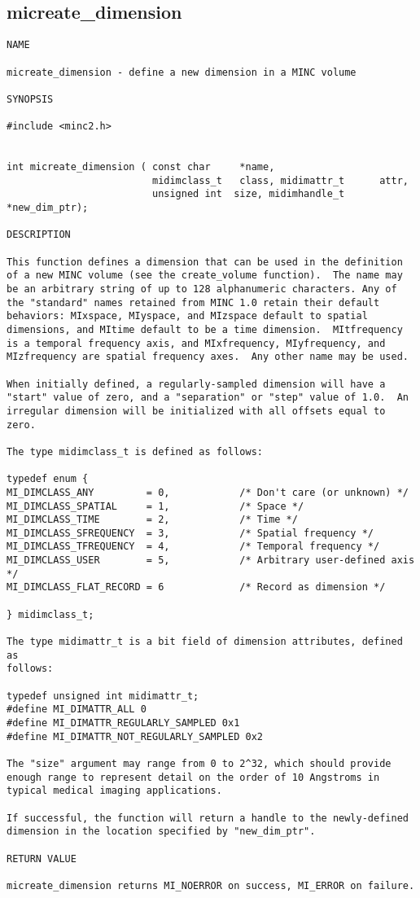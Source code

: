 \documentclass{article}
\begin{document}
\subsection{micreate\_dimension}
\begin{verbatim}
NAME

micreate_dimension - define a new dimension in a MINC volume

SYNOPSIS

#include <minc2.h>


int micreate_dimension ( const char     *name,
                         midimclass_t   class, midimattr_t      attr,
                         unsigned int  size, midimhandle_t     *new_dim_ptr);

DESCRIPTION

This function defines a dimension that can be used in the definition
of a new MINC volume (see the create_volume function).  The name may
be an arbitrary string of up to 128 alphanumeric characters. Any of
the "standard" names retained from MINC 1.0 retain their default
behaviors: MIxspace, MIyspace, and MIzspace default to spatial
dimensions, and MItime default to be a time dimension.  MItfrequency
is a temporal frequency axis, and MIxfrequency, MIyfrequency, and
MIzfrequency are spatial frequency axes.  Any other name may be used.

When initially defined, a regularly-sampled dimension will have a
"start" value of zero, and a "separation" or "step" value of 1.0.  An
irregular dimension will be initialized with all offsets equal to
zero.

The type midimclass_t is defined as follows:

typedef enum { 
MI_DIMCLASS_ANY         = 0,            /* Don't care (or unknown) */
MI_DIMCLASS_SPATIAL     = 1,            /* Space */
MI_DIMCLASS_TIME        = 2,            /* Time */
MI_DIMCLASS_SFREQUENCY  = 3,            /* Spatial frequency */
MI_DIMCLASS_TFREQUENCY  = 4,            /* Temporal frequency */
MI_DIMCLASS_USER        = 5,            /* Arbitrary user-defined axis */
MI_DIMCLASS_FLAT_RECORD = 6             /* Record as dimension */

} midimclass_t;

The type midimattr_t is a bit field of dimension attributes, defined as
follows:

typedef unsigned int midimattr_t; 
#define MI_DIMATTR_ALL 0
#define MI_DIMATTR_REGULARLY_SAMPLED 0x1
#define MI_DIMATTR_NOT_REGULARLY_SAMPLED 0x2

The "size" argument may range from 0 to 2^32, which should provide
enough range to represent detail on the order of 10 Angstroms in
typical medical imaging applications.

If successful, the function will return a handle to the newly-defined
dimension in the location specified by "new_dim_ptr".

RETURN VALUE

micreate_dimension returns MI_NOERROR on success, MI_ERROR on failure.
\end{verbatim}
\end{document}
